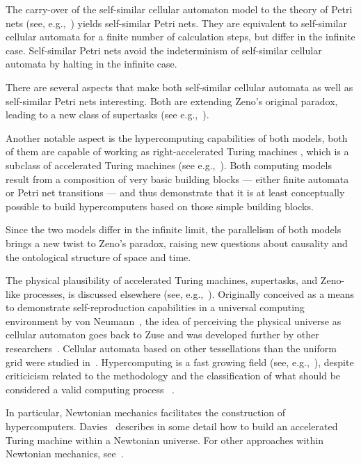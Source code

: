 \documentclass{article}
\theoremstyle{definition}
\begin{document}
The carry-over of the self-similar cellular automaton model to the theory of Petri nets
(see, e.g.,~\cite{Murata89}) yields self-similar Petri nets.
They are equivalent to self-similar cellular automata for a finite number of calculation steps, but differ in the infinite case.
Self-similar Petri nets avoid the indeterminism of self-similar cellular automata by
halting in the infinite case.

There are several aspects that make both
self-similar cellular automata as well as self-similar Petri nets interesting.
Both are extending Zeno's original paradox, leading to a new class of supertasks (see e.g.,~\cite{en96}).

Another notable aspect is the hypercomputing capabilities of both models,
both of them are capable of working as  right-accelerated Turing machines \cite{2008-sica},
which is a subclass of accelerated Turing machines (see e.g.,~\cite{ord-2006}).
Both computing models result from a composition of very basic building blocks --- either finite automata or
Petri net transitions --- and thus demonstrate that it is at least conceptually possible to
build hypercomputers based on those simple building blocks.

Since the two models differ in the infinite limit, the parallelism of both models brings a new twist to Zeno's paradox,
raising new questions about causality and the ontological structure of space and time.

The physical plausibility of accelerated Turing machines, supertasks, and Zeno-like processes,
is discussed elsewhere (see, e.g.,~\cite{sv-aut-rev}).
Originally conceived as a means to demonstrate self-reproduction capabilities in a universal computing
environment by von Neumann~\cite{v-neumann-66},
the idea of perceiving the physical universe as cellular automaton goes back to Zuse \cite{Zuse:67} and was
developed further  by other researchers~\cite{fredkin,toffoli-margolus-90,wolfram-2002}.
Cellular automata based on other tessellations than the uniform grid  were studied in~\cite{margenstern99}.
Hypercomputing is a fast growing field (see, e.g.,~\cite{ord-2006}),
despite criticicism related to the methodology and the classification of
 what should be considered a valid computing process ~\cite{Davis-2004,Davis-2006,potgieter-06}.

In particular, Newtonian mechanics facilitates the construction of hypercomputers.
Davies~\cite{Davies01} describes in some detail how to build an accelerated Turing machine within a Newtonian universe.
For other approaches within Newtonian mechanics, see~\cite{beggs-tucker-06,svozil-2007-cestial}.
\end{document}

